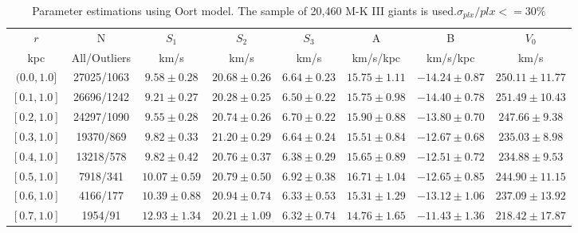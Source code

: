 \documentclass[onecolumn]{aa}   %
\begin{document}
\begin{table}[ht]
\caption{\label{tab: OortMod_errplx30}
Parameter estimations using Oort model.  The sample of 20,460 M-K III giants is used.$\sigma_{plx}/plx<=30\%$}
\centering
\begin{tabular}{c c c c c c c c}
\hline
$r$   				&N    		&$S_1$ 	&$S_2$  	&$S_3$		&A      	 	& B        		&$V_0$ \\
kpc		&  All/Outliers   &km/s	&km/s 	&km/s       &km/s/kpc        & km/s/kpc  	&km/s \\
\hline
$(0.0,1.0]$		&27025/1063 &$9.58 \pm 0.28$    &$20.68 \pm 0.26$   &$6.64 \pm 0.23$    &$15.75 \pm 1.11$   &$-14.24 \pm 0.87$  &$250.11 \pm 11.77$ \\

$[0.1, 1.0]$		&26696/1242 &$9.21 \pm 0.27$    &$20.28 \pm 0.25$   &$6.50 \pm 0.22$    &$15.75 \pm 0.98$   &$-14.40 \pm 0.78$  &$251.49 \pm 10.43$ \\

$[0.2, 1.0]$		&24297/1090 &$9.55 \pm 0.28$    &$20.74 \pm 0.26$   &$6.70 \pm 0.22$    &$15.90 \pm 0.88$   &$-13.80 \pm 0.70$  &$247.66 \pm 9.38$ \\

$[0.3, 1.0]$		&19370/869  &$9.82 \pm 0.33$    &$21.20 \pm 0.29$   &$6.64 \pm 0.24$    &$15.51 \pm 0.84$   &$-12.67 \pm 0.68$  &$235.03 \pm 8.98$ \\

$[0.4, 1.0]$		&13218/578  &$9.82 \pm 0.42$    &$20.76 \pm 0.37$   &$6.38 \pm 0.29$    &$15.65 \pm 0.89$   &$-12.51 \pm 0.72$  &$234.88 \pm 9.53$ \\

$[0.5, 1.0]$		&7918/341   &$10.07 \pm 0.59$   &$20.79 \pm 0.50$   &$6.92 \pm 0.38$    &$16.71 \pm 1.04$   &$-12.65 \pm 0.85$  &$244.90 \pm 11.15$ \\

$[0.6, 1.0]$		&4166/177   &$10.39 \pm 0.88$   &$20.94 \pm 0.74$   &$6.33 \pm 0.53$    &$15.31 \pm 1.29$   &$-13.12 \pm 1.06$  &$237.09 \pm 13.92$ \\

$[0.7, 1.0]$		&1954/91    &$12.93 \pm 1.34$   &$20.21 \pm 1.09$   &$6.32 \pm 0.74$    &$14.76 \pm 1.65$   &$-11.43 \pm 1.36$  &$218.42 \pm 17.87$ \\
\hline
\end{tabular}
\end{table}
\end{document}
